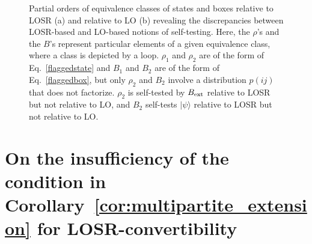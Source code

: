 \documentclass[12pt]{article}
\theoremstyle{plain}
\theoremstyle{definition}
\begin{document}
\begin{appendices}
 \begin{figure}[h!]
 \centering
    \hspace{3mm}
    \caption{Partial orders of equivalence classes of states and boxes relative to LOSR (a) and relative to LO (b) revealing the discrepancies between LOSR-based and LO-based notions of self-testing.  Here, the $\rho$'s and the $B$'s represent particular elements of a given equivalence class, where a class is depicted by a loop. $\rho_1$ and $\rho_2$ are of the form of Eq.~\eqref{flaggedstate} and $B_1$ and $B_2$ are of the form of Eq.~\eqref{flaggedbox}, but only $\rho_2$ and $B_2$ involve a distribution $p(ij)$ that does not factorize.  
 $\rho_2$ is self-tested by $B_{\rm ext}$ relative to LOSR but not relative to LO, and $B_2$ self-tests $|\psi\rangle$ relative to LOSR but not relative to LO.
   }
    \label{LOvsLOSRorders}
\end{figure}





\section{On the insufficiency of the condition in Corollary~\ref{cor:multipartite_extension} for LOSR-convertibility} \label{insufficiency}


\end{appendices}
\end{document}
